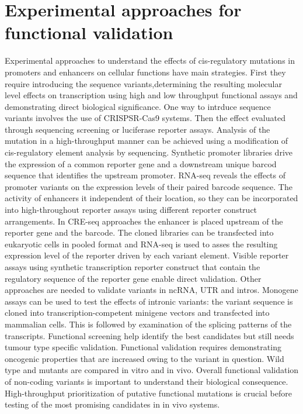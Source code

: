 \section{Experimental approaches for functional validation}
Experimental approaches to understand the effects of cis-regulatory mutations in promoters and enhancers on cellular functions have main strategies.
First they require introducing the sequence variants,determining the resulting molecular level effects on transcription using high and low throughput functional assays and demonstrating direct biological significance.
One way to intrduce sequence variants involves the use of CRISPSR-Cas9 systems.
Then the effect evaluated through sequencing screening or luciferase reporter assays.
Analysis of the mutation in a high-throughput manner can be achieved using a modification of cis-regulatory element analysis by sequencing.
Synthetic promoter libraries drive the expression of a common reporter gene and a downstream unique barcod sequence that identifies the upstream promoter.
RNA-seq reveals the effects of promoter variants on the expression levels of their paired barcode sequence.
The activity of enhancers it independent of their location, so they can be incorporated into high-throughout reporter assays using different reporter construct arrangements.
In CRE-seq approaches the enhancer is placed upstream of the reporter gene and the barcode.
The cloned libraries can be transfected into eukaryotic cells in pooled format and RNA-seq is used to asses the resulting expression level of the reporter driven by each variant element.
Visible reporter assays using synthetic transcription reporter construct that contain the regulatory sequence of the reporter gene enable direct validation.
Other approaches are needed to validate variants in ncRNA, UTR and intros.
Monogene assays can be used to test the effects of intronic variants: the variant sequence is cloned into transcription-competent minigene vectors and transfected into mammalian cells.
This is followed by examination of the splicing patterns of the transcripts.
Functional screening help identify the best candidates  but still needs tumour type specific validation.
Functional validation requires demonstrating oncogenic properties that are increased owing to the variant in question.
Wild type and mutants are compared in vitro and in vivo.
Overall functional validation of non-coding variants is important to understand their biological consequence.
High-throughput prioritization of putative functional mutations is crucial before testing of the most promising candidates in in vivo systems.
